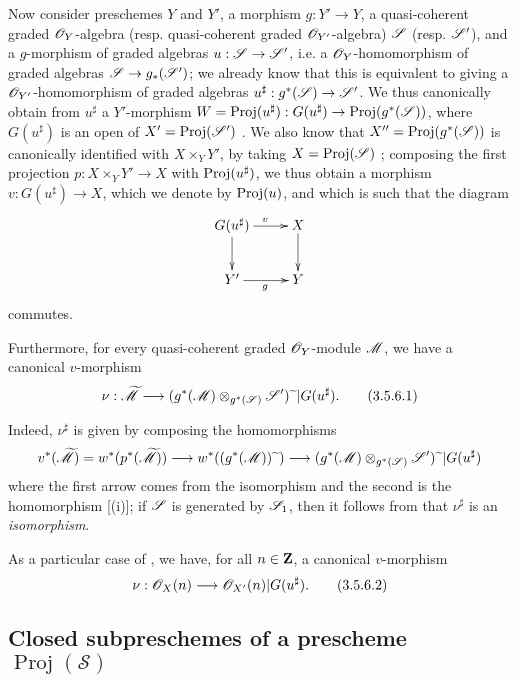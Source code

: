 \begin{env}[3.5.6]
\label{II.3.5.6}
Now consider preschemes $Y$ and $Y'$, a morphism $g:Y'\to Y$, a quasi-coherent graded $\mathscr{O}_Y$-algebra (resp. quasi-coherent graded $\mathscr{O}_{Y'}$-algebra) $\mathscr{S}$ (resp. $\mathscr{S}'$), and a $g$-morphism of graded algebras $u:\sh{S}\to\sh{S}'$, i.e. a $\mathscr{O}_Y$-homomorphism of graded algebras $\sh{S}\to g_*(\sh{S}')$;
we already know that this is equivalent to giving a $\mathscr{O}_{Y'}$-homomorphism of graded algebras $u^\sharp:g^*(\sh{S})\to\sh{S}'$.
We thus canonically obtain from $u^\sharp$ a $Y'$-morphism $W=\Proj(u^\sharp):G(u^\sharp)\to\Proj(g^*(\sh{S}))$, where $G(u^\sharp)$ is an open of $X'=\operatorname{Proj}(\mathscr{S}')$ .
We also know that $X''=\operatorname{Proj}(g^*(\mathscr{S}))$ is canonically identified with $X\times_Y Y'$, by taking $X=\operatorname{Proj}(\mathscr{S})$ ;
composing the first projection $p:X\times_Y Y'\to X$ with $\operatorname{Proj}(u^\sharp)$, we thus obtain a morphism $v:G(u^\sharp)\to X$, which we denote by $\operatorname{Proj}(u)$, and which is such that the diagram
\[
  \xymatrix{
    G(u^\sharp) \ar[r]^{v} \ar[d]
    & X \ar[d]
  \\Y' \ar[r]_{g}
    & Y
  }
\]
commutes.

Furthermore, for every quasi-coherent graded $\mathscr{O}_Y$-module $\mathscr{M}$, we have a canonical $v$-morphism
\[
\label{II.3.5.6.1}
  \nu : \widetilde{\sh{M}} \to (g^*(\sh{M})\otimes_{g^*(\sh{S})}\sh{S}')\supertilde|G(u^\sharp).
\tag{3.5.6.1}
\]

Indeed, $\nu^\sharp$ is given by composing the homomorphisms
\[
  v^*(\widetilde{\sh{M}})
  = w^*(p^*(\widetilde{\sh{M}}))
  \to w^*((g^*(\sh{M}))\supertilde)
  \to (g^*(\sh{M})\otimes_{g^*(\sh{S})}\sh{S}')\supertilde|G(u^\sharp)
\]
where the first arrow comes from the isomorphism  and the second is the homomorphism [(i)];
if $\mathscr{S}$ is generated by $\mathscr{S}_1$, then it follows from  that $\nu^\sharp$ is an \emph{isomorphism}.

As a particular case of , we have, for all $n\in\mathbf{Z}$, a canonical $v$-morphism
\[
\label{II.3.5.6.2}
  \nu : \sh{O}_X(n) \to \sh{O}_{X'}(n)|G(u^\sharp).
\tag{3.5.6.2}
\]
\end{env}


\subsection{Closed subpreschemes of a prescheme $\operatorname{Proj}(\mathcal{S})$}
\label{subsection:II.3.6}

